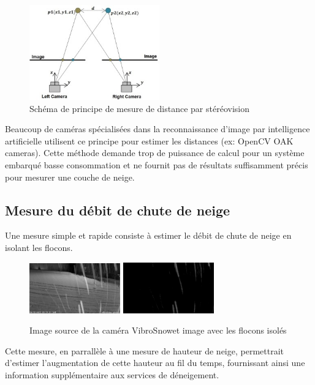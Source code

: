 \begin{figure}[H]
    \centering
    \includegraphics[width=0.5\textwidth]{Images/computer_vision/stereovision.jpg}
    \caption[Schéma de principe stéréovision]{Schéma de principe de mesure de distance par stéréovision}
    \label{fig:Stereovision}
\end{figure}
\noindent
Beaucoup de caméras spécialisées dans la reconnaissance d'image par intelligence artificielle utilisent ce principe
pour estimer les distances (ex: OpenCV OAK cameras).
Cette méthode demande trop de puissance de calcul pour un système embarqué basse consommation et ne fournit
pas de résultats suffisamment précis pour mesurer une couche de neige.
\newpage

\subsection{Mesure du débit de chute de neige}
Une mesure simple et rapide consiste à estimer le débit de chute de neige en isolant les flocons.
\begin{figure}[H]
    \centering
    \includegraphics[width=0.35\textwidth]{Images/computer_vision/snow_cam.png}
    \includegraphics[width=0.35\textwidth]{Images/computer_vision/snowfall.png}
    \caption[Comparaison image source et bruit sur image]{Image source de la caméra VibroSnow\footnotemark[1] et image avec les flocons isolés}
    \label{fig:Snowfall}
\end{figure}
\noindent
Cette mesure, en parrallèle à une mesure de hauteur de neige, permettrait d'estimer 
l'augmentation de cette hauteur au fil du temps, fournissant ainsi une information supplémentaire
aux services de déneigement.


